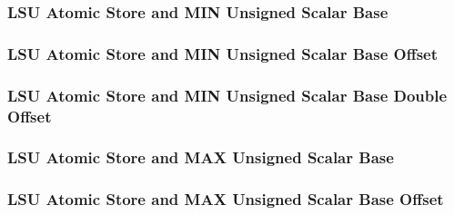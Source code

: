 \subsubsection[{\small LSU Atomic Store and MIN Unsigned Scalar Base}]{LSU Atomic Store and MIN Unsigned Scalar Base} \label{sec:format-LSU-ASMINUSB}



\subsubsection[{\small LSU Atomic Store and MIN Unsigned Scalar Base Offset}]{LSU Atomic Store and MIN Unsigned Scalar Base Offset} \label{sec:format-LSU-ASMINUSB.O}



\subsubsection[{\small LSU Atomic Store and MIN Unsigned Scalar Base Double Offset}]{LSU Atomic Store and MIN Unsigned Scalar Base Double Offset} \label{sec:format-LSU-ASMINUSB.D}



\subsubsection[{\small LSU Atomic Store and MAX Unsigned Scalar Base}]{LSU Atomic Store and MAX Unsigned Scalar Base} \label{sec:format-LSU-ASMAXUSB}



\subsubsection[{\small LSU Atomic Store and MAX Unsigned Scalar Base Offset}]{LSU Atomic Store and MAX Unsigned Scalar Base Offset} \label{sec:format-LSU-ASMAXUSB.O}



